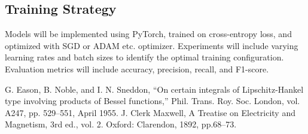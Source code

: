\documentclass[conference]{IEEEtran}
\begin{document}
\subsection{Training Strategy}
Models will be implemented using PyTorch, trained on cross-entropy loss, and optimized with SGD or ADAM etc. optimizer. Experiments will include varying learning rates and batch sizes to identify the optimal training configuration. Evaluation metrics will include accuracy, precision, recall, and F1-score.




\begin{thebibliography}{00}
 G. Eason, B. Noble, and I. N. Sneddon, ``On certain integrals of Lipschitz-Hankel type involving products of Bessel functions,'' Phil. Trans. Roy. Soc. London, vol. A247, pp. 529--551, April 1955.
 J. Clerk Maxwell, A Treatise on Electricity and Magnetism, 3rd ed., vol. 2. Oxford: Clarendon, 1892, pp.68--73.
\end{thebibliography}
\end{document}
